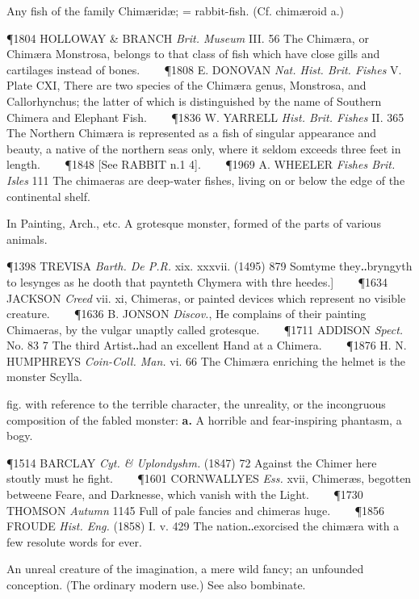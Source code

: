 \begin{description}[wide, labelwidth=!, labelindent=0pt]
\begin{myenumerate}
 Any fish of the family Chimæridæ; = rabbit-fish. (Cf. chimæroid a.)

\P 1804 HOLLOWAY  \& BRANCH \textit{Brit. Museum} III. 56 The Chimæra, or Chimæra Monstrosa, belongs to that class of fish which have close gills and cartilages instead of bones.    
\P 1808 E. DONOVAN  \textit{Nat. Hist. Brit. Fishes} V. Plate CXI, There are two species of the Chimæra genus, Monstrosa, and Callorhynchus; the latter of which is distinguished by the name of Southern Chimera and Elephant Fish.    
\P 1836 W. YARRELL  \textit{Hist. Brit. Fishes} II. 365 The Northern Chimæra is represented as a fish of singular appearance and beauty, a native of the northern seas only, where it seldom exceeds three feet in length.    
\P 1848 [See  RABBIT n.1 4].    
\P 1969 A. WHEELER  \textit{Fishes Brit. Isles} 111 The chimaeras are deep-water fishes, living on or below the edge of the continental shelf.

 In Painting, Arch., etc. A grotesque monster, formed of the parts of various animals.

\P 1398 TREVISA  \textit{Barth. De P.R.} xix. xxxvii. (1495) 879 Somtyme they‥bryngyth to lesynges as he dooth that paynteth Chymera with thre heedes.]    
\P 1634 JACKSON  \textit{Creed} vii. xi, Chimeras, or painted devices which represent no visible creature.    
\P 1636 B. JONSON  \textit{Discov.}, He complains of their painting Chimaeras, by the vulgar unaptly called grotesque.    
\P 1711 ADDISON  \textit{Spect.} No. 83 7 The third Artist‥had an excellent Hand at a Chimera.    
\P 1876 H. N. HUMPHREYS  \textit{Coin-Coll. Man.} vi. 66 The Chimæra enriching the helmet is the monster Scylla.

 fig. with reference to the terrible character, the unreality, or the
incongruous composition of the fabled monster: \textbf{a.} A horrible and fear-inspiring phantasm, a bogy.

\P 1514 BARCLAY  \textit{Cyt. \& Uplondyshm.} (1847) 72 Against the Chimer here stoutly must he fight.    
\P 1601 CORNWALLYES  \textit{Ess.} xvii, Chimeræs, begotten betweene Feare, and Darknesse, which vanish with the Light.    
\P 1730 THOMSON \textit{Autumn} 1145 Full  of pale fancies and chimeras huge.    
\P 1856 FROUDE  \textit{Hist. Eng.} (1858) I. v. 429 The nation‥exorcised the chimæra with a few resolute words for ever.

 An unreal creature of the imagination, a mere wild fancy; an unfounded conception. (The ordinary modern use.) See also bombinate.


\end{myenumerate}
\end{description}
